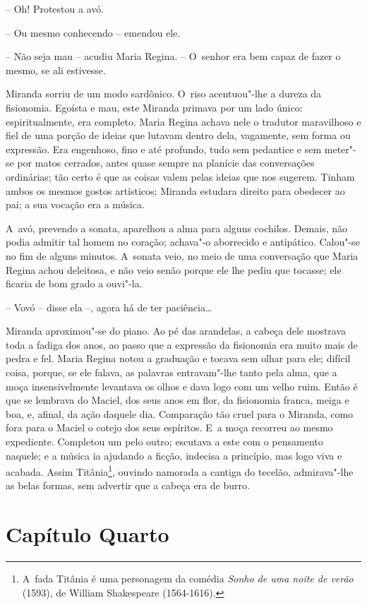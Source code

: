 -- Oh! Protestou a avó.

-- Ou mesmo conhecendo -- emendou ele.

-- Não seja mau -- acudiu Maria Regina. -- O~senhor era bem capaz de
fazer o mesmo, se ali estivesse.

Miranda sorriu de um modo sardônico. O~riso acentuou"-lhe a dureza da
fisionomia. Egoísta e mau, este Miranda primava por um lado único:
espiritualmente, era completo. Maria Regina achava nele o tradutor
maravilhoso e fiel de uma porção de ideias que lutavam dentro dela,
vagamente, sem forma ou expressão. Era engenhoso, fino e até profundo,
tudo sem pedantice e sem meter"-se por matos cerrados, antes quase sempre
na planície das conversações ordinárias; tão certo é que as coisas valem
pelas ideias que nos sugerem. Tinham ambos os mesmos gostos artísticos;
Miranda estudara direito para obedecer ao pai; a sua vocação era a
música.

A~avó, prevendo a sonata, aparelhou a alma para alguns cochilos. Demais,
não podia admitir tal homem no coração; achava"-o aborrecido e
antipático. Calou"-se no fim de alguns minutos. A~sonata veio, no meio de
uma conversação que Maria Regina achou deleitosa, e não veio senão
porque ele lhe pediu que tocasse; ele ficaria de bom grado a ouvi"-la.

-- Vovó -- disse ela --, agora há de ter paciência\ldots{}

Miranda aproximou"-se do piano. Ao pé das arandelas, a cabeça dele
mostrava toda a fadiga dos anos, ao passo que a expressão da fisionomia
era muito mais de pedra e fel. Maria Regina notou a graduação e tocava
sem olhar para ele; difícil coisa, porque, se ele falava, as palavras
entravam"-lhe tanto pela alma, que a moça insensivelmente levantava os
olhos e dava logo com um velho ruim. Então é que se lembrava do Maciel,
dos seus anos em flor, da fisionomia franca, meiga e boa, e, afinal, da
ação daquele dia. Comparação tão cruel para o Miranda, como fora para o
Maciel o cotejo dos seus espíritos. E~a moça recorreu ao mesmo
expediente. Completou um pelo outro; escutava a este com o pensamento
naquele; e a música ia ajudando a ficção, indecisa a princípio, mas logo
viva e acabada. Assim Titânia\footnote{A~fada Titânia é uma personagem
  da comédia \emph{Sonho de uma noite de verão} (1593), de William
  Shakespeare (1564-1616).}, ouvindo namorada a cantiga do tecelão,
admirava"-lhe as belas formas, sem advertir que a cabeça era de burro.

\section{Capítulo Quarto}


